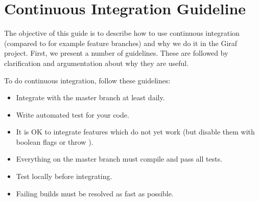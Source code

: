 \chapter{Continuous Integration Guideline}\label{app:ci_guide}
The objective of this guide is to describe how to use continuous integration (compared to for example feature branches) and why we do it in the Giraf project. First, we present a number of guidelines. These are followed by clarification and argumentation about why they are useful.

To do continuous integration, follow these guidelines:
\begin{itemize}
  \item Integrate with the master branch at least daily.
  \item Write automated test for your code.
  \item It is OK to integrate features which do not yet work (but disable them with boolean flags or throw ).
  \item Everything on the master branch must compile and pass all tests.
  \item Test locally before integrating.
  \item Failing builds must be resolved as fast as possible.
\end{itemize}

